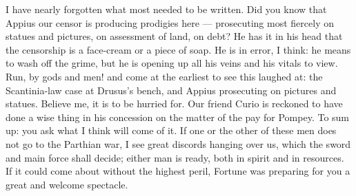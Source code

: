  I have nearly forgotten what most needed to be written. Did you know that Appius our censor is producing prodigies here --- prosecuting most fiercely on statues and pictures, on assessment of land, on debt? He has it in his head that the censorship is a face-cream or a piece of soap. He is in error, I think: he means to wash off the grime, but he is opening up all his veins and his vitals to view. Run, by gods and men! and come at the earliest to see this laughed at: the Scantinia-law case at Drusus's bench, and Appius prosecuting on pictures and statues. Believe me, it is to be hurried for. Our friend Curio is reckoned to have done a wise thing in his concession on the matter of the pay for Pompey. To sum up: you ask what I think will come of it. If one or the other of these men does not go to the Parthian war, I see great discords hanging over us, which the sword and main force shall decide; either man is ready, both in spirit and in resources. If it could come about without the highest peril, Fortune was preparing for you a great and welcome spectacle.
